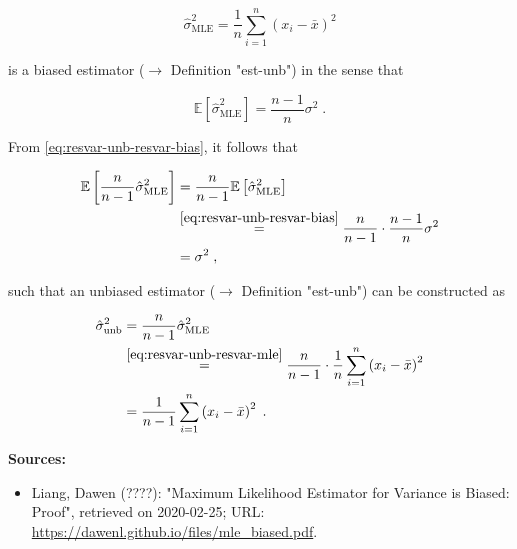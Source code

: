 \documentclass[a4paper,12pt,twoside]{book}
\begin{document}
\begin{equation} \label{eq:resvar-unb-resvar-mle}
\hat{\sigma}^2_{\mathrm{MLE}} = \frac{1}{n} \sum_{i=1}^{n} \left( x_i - \bar{x} \right)^2
\end{equation}

is a biased estimator ($\rightarrow$ Definition "est-unb") in the sense that

\begin{equation} \label{eq:resvar-unb-resvar-bias}
\mathbb{E}\left[ \hat{\sigma}^2_{\mathrm{MLE}} \right] = \frac{n-1}{n} \sigma^2 \; .
\end{equation}

From \eqref{eq:resvar-unb-resvar-bias}, it follows that

\begin{equation} \label{eq:resvar-unb-resvar-bias-adj}
\begin{split}
\mathbb{E}\left[ \frac{n}{n-1} \hat{\sigma}^2_{\mathrm{MLE}} \right] &= \frac{n}{n-1} \mathbb{E}\left[ \hat{\sigma}^2_{\mathrm{MLE}} \right] \\
&\overset{\eqref{eq:resvar-unb-resvar-bias}}{=} \frac{n}{n-1} \cdot \frac{n-1}{n} \sigma^2 \\
&= \sigma^2 \; ,
\end{split}
\end{equation}

such that an unbiased estimator ($\rightarrow$ Definition "est-unb") can be constructed as

\begin{equation} \label{eq:resvar-unb-resvar-unb-qed}
\begin{split}
\hat{\sigma}^2_{\mathrm{unb}} &= \frac{n}{n-1} \hat{\sigma}^2_{\mathrm{MLE}} \\
&\overset{\eqref{eq:resvar-unb-resvar-mle}}{=} \frac{n}{n-1} \cdot \frac{1}{n} \sum_{i=1}^{n} \left( x_i - \bar{x} \right)^2 \\
&= \frac{1}{n-1} \sum_{i=1}^{n} \left( x_i - \bar{x} \right)^2 \; .
\end{split}
\end{equation}


\vspace{1em}
\textbf{Sources:}
\begin{itemize}
\item Liang, Dawen (????): "Maximum Likelihood Estimator for Variance is Biased: Proof", retrieved on 2020-02-25; URL: \url{https://dawenl.github.io/files/mle_biased.pdf}.
\end{itemize}
\end{document}
